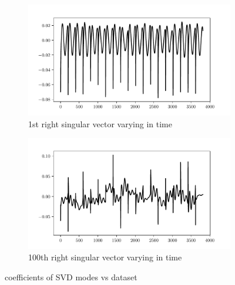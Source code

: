 \documentclass[10pt]{article}
\begin{document}
\begin{figure}[t]\centering
\begin{subfigure}{.45\textwidth}\centering
    \includegraphics[width=\textwidth]{img/svd_coeff_1.pdf}
    \caption{1st right singular vector varying in time}
    \label{1coeff}
\end{subfigure}
\begin{subfigure}{.45\textwidth}\centering
    \includegraphics[width=\textwidth]{img/svd_coeff_100.pdf}
    \caption{100th right singular vector varying in time}
    \label{100coeff}
\end{subfigure}
\caption{coefficients of SVD modes vs dataset}
\label{SVD_coeff}
\end{figure}
\end{document}
